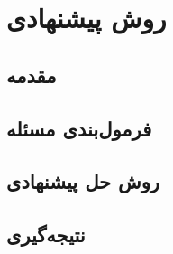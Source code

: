\chapter{روش پیشنهادی}

\section{مقدمه}
\section{فرمول‌بندی مسئله}
\section{روش حل پیشنهادی}
\section{نتیجه‌گیری}
